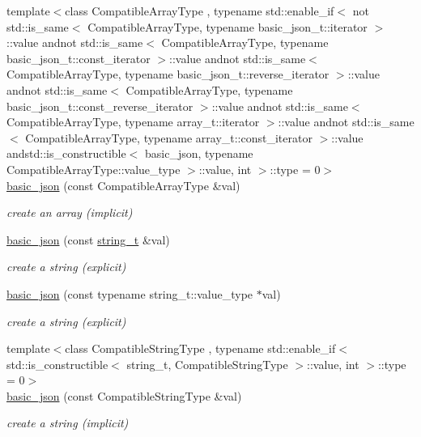 \begin{DoxyCompactItemize}
{\footnotesize template$<$class Compatible\-Array\-Type , typename std\-::enable\-\_\-if$<$ not std\-::is\-\_\-same$<$ Compatible\-Array\-Type, typename basic\-\_\-json\-\_\-t\-::iterator $>$\-::value andnot std\-::is\-\_\-same$<$ Compatible\-Array\-Type, typename basic\-\_\-json\-\_\-t\-::const\-\_\-iterator $>$\-::value andnot std\-::is\-\_\-same$<$ Compatible\-Array\-Type, typename basic\-\_\-json\-\_\-t\-::reverse\-\_\-iterator $>$\-::value andnot std\-::is\-\_\-same$<$ Compatible\-Array\-Type, typename basic\-\_\-json\-\_\-t\-::const\-\_\-reverse\-\_\-iterator $>$\-::value andnot std\-::is\-\_\-same$<$ Compatible\-Array\-Type, typename array\-\_\-t\-::iterator $>$\-::value andnot std\-::is\-\_\-same$<$ Compatible\-Array\-Type, typename array\-\_\-t\-::const\-\_\-iterator $>$\-::value andstd\-::is\-\_\-constructible$<$ basic\-\_\-json, typename Compatible\-Array\-Type\-::value\-\_\-type $>$\-::value, int $>$\-::type  = 0$>$ }\\\hyperlink{classnlohmann_1_1basic__json_a81aaaab0f3b326afda2d226daab4f1e1}{basic\-\_\-json} (const Compatible\-Array\-Type \&val)
\begin{DoxyCompactList}\small\item\em create an array (implicit) \end{DoxyCompactList}\item 
\hyperlink{classnlohmann_1_1basic__json_ab8b43d92a042dde96c28aeea81dd52de}{basic\-\_\-json} (const \hyperlink{classnlohmann_1_1basic__json_ab63e618bbb0371042b1bec17f5891f42}{string\-\_\-t} \&val)
\begin{DoxyCompactList}\small\item\em create a string (explicit) \end{DoxyCompactList}\item 
\hyperlink{classnlohmann_1_1basic__json_a3654da9a84deaf61899c4eee5b93c2c5}{basic\-\_\-json} (const typename string\-\_\-t\-::value\-\_\-type $\ast$val)
\begin{DoxyCompactList}\small\item\em create a string (explicit) \end{DoxyCompactList}\item 
{\footnotesize template$<$class Compatible\-String\-Type , typename std\-::enable\-\_\-if$<$ std\-::is\-\_\-constructible$<$ string\-\_\-t, Compatible\-String\-Type $>$\-::value, int $>$\-::type  = 0$>$ }\\\hyperlink{classnlohmann_1_1basic__json_ae85d91b0620650bcd9993e09d0e287d9}{basic\-\_\-json} (const Compatible\-String\-Type \&val)
\begin{DoxyCompactList}\small\item\em create a string (implicit) \end{DoxyCompactList}\item 

\end{DoxyCompactItemize}
